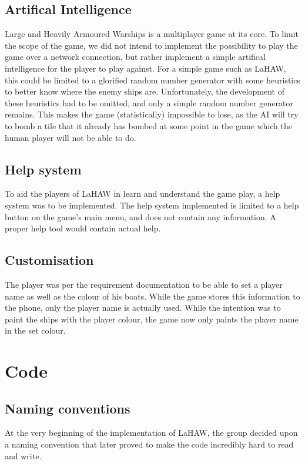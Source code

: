 \subsection{Artifical Intelligence}
Large and Heavily Armoured Warships is a multiplayer game at its core. To limit the scope of the game, we did not intend to implement the possibility to play the game over a network connection, but rather implement a simple artifical intelligence for the player to play against. For a simple game such as LaHAW, this could be limited to a glorified random number generator with some heuristics to better know where the enemy ships are. Unfortunately, the development of these heuristics had to be omitted, and only a simple random number generator remains. This makes the game (statistically) impossible to lose, as the AI will try to bomb a tile that it already has bombed at some point in the game which the human player will not be able to do.

\subsection{Help system}
To aid the players of LaHAW in learn and understand the game play, a help system was to be implemented. The help system implemented is limited to a help button on the game's main menu, and does not contain any information. A proper help tool would contain actual help.

\subsection{Customisation}
The player was per the requirement documentation to be able to set a player name as well as the colour of his boats. While the game stores this information to the phone, only the player name is actually used. While the intention was to paint the ships with the player colour, the game now only paints the player name in the set colour.



\section{Code}

\subsection{Naming conventions}
At the very beginning of the implementation of LaHAW, the group decided upon a naming convention that later proved to make the code incredibly hard to read and write.


